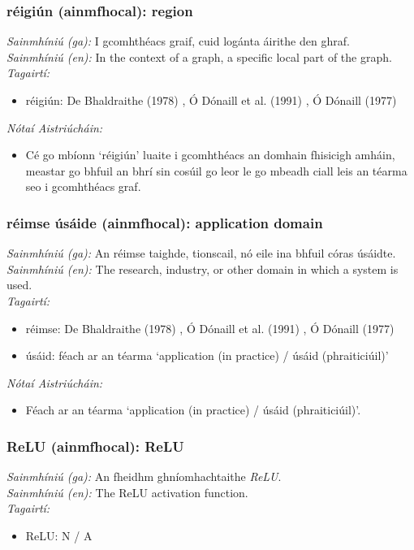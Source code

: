 \subsubsection*{réigiún (ainmfhocal): region}
 \noindent \textit{Sainmhíniú (ga):} I gcomhthéacs graif, cuid logánta áirithe den ghraf.
\\
 \noindent \textit{Sainmhíniú (en):} In the context of a graph, a specific local part of the graph.
\\
 \noindent \textit{Tagairtí:}
\begin{itemize}
	\item réigiún: De Bhaldraithe (1978) \cite{de-bhaldraithe}, Ó Dónaill et al. (1991) \cite{focloir-beag}, Ó Dónaill (1977) \cite{odonaill}
\end{itemize}

 \noindent \textit{Nótaí Aistriúcháin:}
\begin{itemize}
	\item Cé go mbíonn `réigiún' luaite i gcomhthéacs an domhain fhisicigh amháin, meastar go bhfuil an bhrí sin cosúil go leor le go mbeadh ciall leis an téarma seo i gcomhthéacs graf.
\end{itemize}


\subsubsection*{réimse úsáide (ainmfhocal): application domain}
 \noindent \textit{Sainmhíniú (ga):} An réimse taighde, tionscail, nó eile ina bhfuil córas úsáidte.
\\
 \noindent \textit{Sainmhíniú (en):} The research, industry, or other domain in which a system is used.
\\
 \noindent \textit{Tagairtí:}
\begin{itemize}
	\item réimse: De Bhaldraithe (1978) \cite{de-bhaldraithe}, Ó Dónaill et al. (1991) \cite{focloir-beag}, Ó Dónaill (1977) \cite{odonaill}
	\item úsáid: féach ar an téarma `application (in practice) / úsáid (phraiticiúil)'
\end{itemize}

 \noindent \textit{Nótaí Aistriúcháin:}
\begin{itemize}
	\item Féach ar an téarma `application (in practice) / úsáid (phraiticiúil)'.
\end{itemize}


\subsubsection*{ReLU (ainmfhocal): ReLU}
 \noindent \textit{Sainmhíniú (ga):} An fheidhm ghníomhachtaithe  \noindent \textit{ReLU}.
\\
 \noindent \textit{Sainmhíniú (en):} The ReLU activation function.
\\
 \noindent \textit{Tagairtí:}
\begin{itemize}
	\item ReLU: N / A
\end{itemize}


